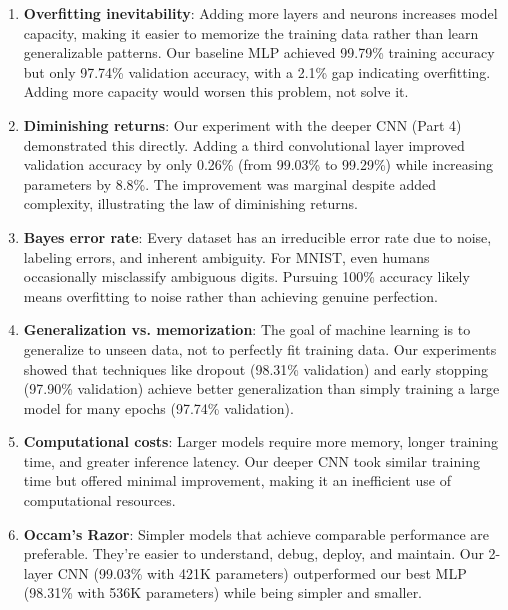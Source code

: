 \begin{enumerate}
    \item \textbf{Overfitting inevitability}: Adding more layers and neurons increases model capacity, making it easier to memorize the training data rather than learn generalizable patterns. Our baseline MLP achieved 99.79\% training accuracy but only 97.74\% validation accuracy, with a 2.1\% gap indicating overfitting. Adding more capacity would worsen this problem, not solve it.
    
    \item \textbf{Diminishing returns}: Our experiment with the deeper CNN (Part 4) demonstrated this directly. Adding a third convolutional layer improved validation accuracy by only 0.26\% (from 99.03\% to 99.29\%) while increasing parameters by 8.8\%. The improvement was marginal despite added complexity, illustrating the law of diminishing returns.
    
    \item \textbf{Bayes error rate}: Every dataset has an irreducible error rate due to noise, labeling errors, and inherent ambiguity. For MNIST, even humans occasionally misclassify ambiguous digits. Pursuing 100\% accuracy likely means overfitting to noise rather than achieving genuine perfection.
    
    \item \textbf{Generalization vs. memorization}: The goal of machine learning is to generalize to unseen data, not to perfectly fit training data. Our experiments showed that techniques like dropout (98.31\% validation) and early stopping (97.90\% validation) achieve better generalization than simply training a large model for many epochs (97.74\% validation).
    
    \item \textbf{Computational costs}: Larger models require more memory, longer training time, and greater inference latency. Our deeper CNN took similar training time but offered minimal improvement, making it an inefficient use of computational resources.
    
    \item \textbf{Occam's Razor}: Simpler models that achieve comparable performance are preferable. They're easier to understand, debug, deploy, and maintain. Our 2-layer CNN (99.03\% with 421K parameters) outperformed our best MLP (98.31\% with 536K parameters) while being simpler and smaller.
\end{enumerate}

